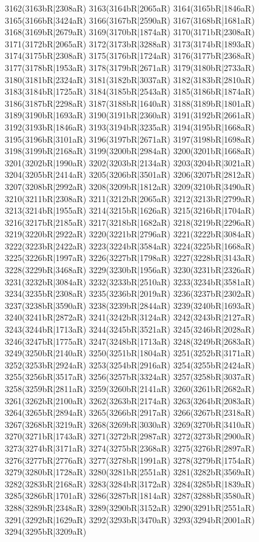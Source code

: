3162(3163bR|2308aR) 3163(3164bR|2065aR) 3164(3165bR|1846aR) 3165(3166bR|3424aR) 3166(3167bR|2590aR) 3167(3168bR|1681aR) \\3168(3169bR|2679aR) 3169(3170bR|1874aR) 3170(3171bR|2308aR) 3171(3172bR|2065aR) 3172(3173bR|3288aR) 3173(3174bR|1893aR) 3174(3175bR|2308aR) 3175(3176bR|1724aR) 3176(3177bR|2368aR) \\3177(3178bR|1953aR) 3178(3179bR|2671aR) 3179(3180bR|2733aR) 3180(3181bR|2324aR) 3181(3182bR|3037aR) 3182(3183bR|2810aR) 3183(3184bR|1725aR) 3184(3185bR|2543aR) 3185(3186bR|1874aR) \\3186(3187bR|2298aR) 3187(3188bR|1640aR) 3188(3189bR|1801aR) 3189(3190bR|1693aR) 3190(3191bR|2360aR) 3191(3192bR|2661aR) 3192(3193bR|1846aR) 3193(3194bR|3235aR) 3194(3195bR|1668aR) \\3195(3196bR|3101aR) 3196(3197bR|2671aR) 3197(3198bR|1698aR) 3198(3199bR|2168aR) 3199(3200bR|2984aR) 3200(3201bR|1668aR) 3201(3202bR|1990aR) 3202(3203bR|2134aR) 3203(3204bR|3021aR) \\3204(3205bR|2414aR) 3205(3206bR|3501aR) 3206(3207bR|2812aR) 3207(3208bR|2992aR) 3208(3209bR|1812aR) 3209(3210bR|3490aR) 3210(3211bR|2308aR) 3211(3212bR|2065aR) 3212(3213bR|2799aR) \\3213(3214bR|1955aR) 3214(3215bR|1626aR) 3215(3216bR|1704aR) 3216(3217bR|2185aR) 3217(3218bR|1682aR) 3218(3219bR|2296aR) 3219(3220bR|2922aR) 3220(3221bR|2796aR) 3221(3222bR|3084aR) \\3222(3223bR|2422aR) 3223(3224bR|3584aR) 3224(3225bR|1668aR) 3225(3226bR|1997aR) 3226(3227bR|1798aR) 3227(3228bR|3143aR) 3228(3229bR|3468aR) 3229(3230bR|1956aR) 3230(3231bR|2326aR) \\3231(3232bR|3084aR) 3232(3233bR|2510aR) 3233(3234bR|3581aR) 3234(3235bR|2308aR) 3235(3236bR|2019aR) 3236(3237bR|2302aR) 3237(3238bR|3590aR) 3238(3239bR|2844aR) 3239(3240bR|1693aR) \\3240(3241bR|2872aR) 3241(3242bR|3124aR) 3242(3243bR|2127aR) 3243(3244bR|1713aR) 3244(3245bR|3521aR) 3245(3246bR|2028aR) 3246(3247bR|1775aR) 3247(3248bR|1713aR) 3248(3249bR|2683aR) \\3249(3250bR|2140aR) 3250(3251bR|1804aR) 3251(3252bR|3171aR) 3252(3253bR|2924aR) 3253(3254bR|2916aR) 3254(3255bR|2424aR) 3255(3256bR|3517aR) 3256(3257bR|3324aR) 3257(3258bR|3037aR) \\3258(3259bR|2811aR) 3259(3260bR|2141aR) 3260(3261bR|2682aR) 3261(3262bR|2100aR) 3262(3263bR|2174aR) 3263(3264bR|2083aR) 3264(3265bR|2894aR) 3265(3266bR|2917aR) 3266(3267bR|2318aR) \\3267(3268bR|3219aR) 3268(3269bR|3030aR) 3269(3270bR|3410aR) 3270(3271bR|1743aR) 3271(3272bR|2987aR) 3272(3273bR|2900aR) 3273(3274bR|3171aR) 3274(3275bR|2368aR) 3275(3276bR|2897aR) \\3276(3277bR|2776aR) 3277(3278bR|1991aR) 3278(3279bR|1754aR) 3279(3280bR|1728aR) 3280(3281bR|2551aR) 3281(3282bR|3569aR) 3282(3283bR|2168aR) 3283(3284bR|3172aR) 3284(3285bR|1839aR) \\3285(3286bR|1701aR) 3286(3287bR|1814aR) 3287(3288bR|3580aR) 3288(3289bR|2348aR) 3289(3290bR|3152aR) 3290(3291bR|2551aR) 3291(3292bR|1629aR) 3292(3293bR|3470aR) 3293(3294bR|2001aR) \\3294(3295bR|3209aR) 